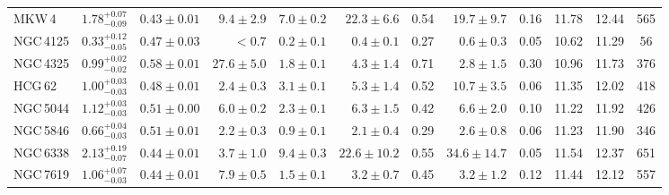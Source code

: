 \begin{table*}
\begin{tabular}{@{}lccrcrcrcccc@{}}
   MKW\,4    & $1.78^{+0.07}_{-0.09}$ & $0.43\pm 0.01$ & $9.4\pm 2.9$ & $7.0 \pm 0.2$ & $22.3\pm 6.6$ & 0.54 & $19.7\pm 9.7$ & 0.16 & 11.78 & 12.44 & 565 \\ 
   NGC\,4125 & $0.33^{+0.12}_{-0.05}$ & $0.47\pm 0.03$ & $<0.7$ & $0.2 \pm 0.1$ & $0.4\pm 0.1$ & 0.27 & $0.6\pm 0.3$   & 0.05 & 10.62 & 11.29 &   56 \\ 
   NGC\,4325 & $0.99^{+0.02}_{-0.02}$ & $0.58\pm 0.01$ & $27.6\pm 5.0$ & $1.8 \pm 0.1$ & $4.3\pm 1.4$ & 0.71 & $2.8\pm 1.5$   & 0.30 & 10.96 & 11.73 &   376 \\ 
   HCG\,62   & $1.00^{+0.03}_{-0.03}$ & $0.48\pm 0.01$ & $2.4\pm 0.3$ & $3.1 \pm 0.1$ & $5.3\pm 1.4$ & 0.52 &  $10.7\pm 3.5$ & 0.06 & 11.35 & 12.02 & 418 \\ 
   NGC\,5044 & $1.12^{+0.03}_{-0.03}$ & $0.51\pm 0.00$ & $6.0\pm 0.2$ & $2.3 \pm 0.1$ & $6.3\pm 1.5$ & 0.42 & $6.6\pm 2.0$   & 0.10 & 11.22 & 11.92 &   426 \\ 
   NGC\,5846 & $0.66^{+0.04}_{-0.03}$ & $0.51\pm 0.01$ & $2.2\pm 0.3$ & $0.9 \pm 0.1$ & $2.1\pm 0.4$ & 0.29 & $2.6\pm 0.8$   & 0.06 & 11.23 & 11.90 &   346 \\ 
   NGC\,6338 & $2.13^{+0.19}_{-0.07}$ & $0.44\pm 0.01$ & $3.7\pm 1.0$ & $9.4 \pm 0.3$ & $22.6\pm 10.2$ & 0.55 & $34.6\pm 14.7$ & 0.05 & 11.54 & 12.37 & 651 \\ 
   NGC\,7619 & $1.06^{+0.07}_{-0.03}$ & $0.44\pm 0.01$ & $7.9\pm 0.5$ & $1.5 \pm 0.1$ & $3.2\pm 0.7$ & 0.45 & $3.2\pm 1.2$ & 0.12 & 11.44 & 12.12 &  557 \\ 
   \end{tabular} 
   \end{table*} 